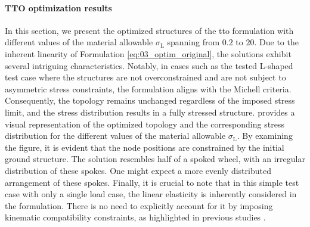 \paragraph{TTO optimization results}
In this section, we present the optimized structures of the \gls{tto} formulation with different values of the material allowable $\sigma_\text{L}$ spanning from $0.2$ to $20$. Due to the inherent linearity of Formulation \ref{eq:03_optim_original}, the solutions exhibit several intriguing characteristics. Notably, in cases such as the tested L-shaped test case where the structures are not overconstrained and are not subject to asymmetric stress constraints, the formulation aligns with the Michell criteria. Consequently, the topology remains unchanged regardless of the imposed stress limit, and the stress distribution results in a fully stressed structure.  provides a visual representation of the optimized topology and the corresponding stress distribution for the different values of the material allowable $\sigma_\text{L}$. By examining the figure, it is evident that the node positions are constrained by the initial ground structure. The solution resembles half of a spoked wheel, with an irregular distribution of these spokes. One might expect a more evenly distributed arrangement of these spokes. Finally, it is crucial to note that in this simple test case with only a single load case, the linear elasticity is inherently considered in the formulation. There is no need to explicitly account for it by imposing kinematic compatibility constraints, as highlighted in previous studies .
